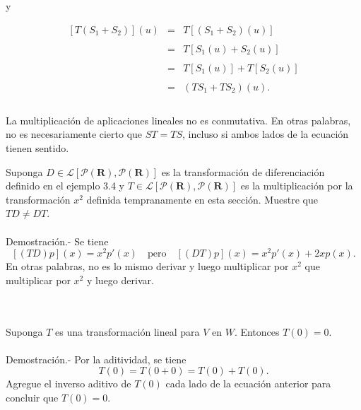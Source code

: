 \begin{myteo}
	\begin{center}
	    y
	\end{center}

	$$
	\begin{array}{rcl}
	    \left[T(S_1+S_2)\right](u) &=& T\left[(S_1+S_2)(u)\right]\\\\
				       &=& T\left[S_1(u)+S_2(u)\right]\\\\
				       &=& T\left[S_1(u)\right]+T\left[S_2(u)\right]\\\\
				       &=& (TS_1+TS_2)(u).\\\\
	\end{array}
	$$
\end{myteo}


La multiplicación de aplicaciones lineales no es conmutativa. En otras palabras, no es necesariamente cierto que $ST=TS$, incluso si ambos lados de la ecuación tienen sentido.

\begin{myejem}
    Suponga $D\in \mathcal{L}\left[\mathcal{P}(\textbf{R}),\mathcal{P}(\textbf{R})\right]$ es la transformación de diferenciación definido en el ejemplo 3.4 y $T\in \mathcal{L}\left[\mathcal{P}(\textbf{R}),\mathcal{P}(\textbf{R})\right]$ es la multiplicación por la transformación $x^2$ definida tempranamente en esta sección. Muestre que $TD\neq DT$.\\\\
	Demostración.-\;  Se tiene 
	$$\left[(TD)p\right](x)=x^2p'(x) \quad \mbox{pero}\quad \left[(DT)p\right](x)=x^2p'(x)+2xp(x).$$
	En otras palabras, no es lo mismo derivar y luego multiplicar por  $x^2$ que multiplicar por $x^2$ y luego derivar.
\end{myejem}

\begin{myteo}\,\\\\
    Suponga $T$ es una transformación lineal para $V$ en $W$. Entonces $T(0)=0$.\\\\
	Demostración.-\; Por la aditividad, se tiene
	$$T(0)=T(0+0)=T(0)+T(0).$$
	Agregue el inverso aditivo de $T(0)$ cada lado de la ecuación anterior para concluir que $T(0)=0$.
\end{myteo}


